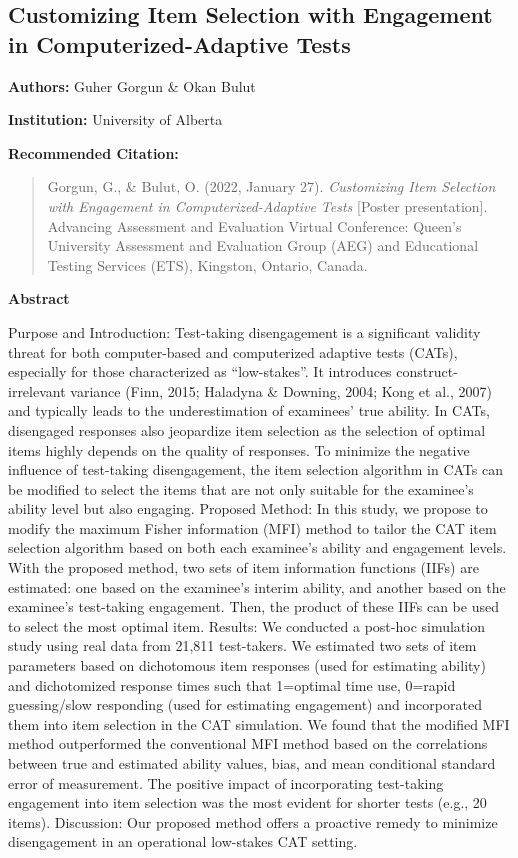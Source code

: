 \documentclass[
]{book}
\begin{document}
\newpage

\hypertarget{customizing-item-selection-with-engagement-in-computerized-adaptive-tests}{%
\subsection{Customizing Item Selection with Engagement in Computerized-Adaptive Tests}\label{customizing-item-selection-with-engagement-in-computerized-adaptive-tests}}

\textbf{Authors:} Guher Gorgun \& Okan Bulut

\textbf{Institution:} University of Alberta

\textbf{Recommended Citation:}

\begin{quote}
Gorgun, G., \& Bulut, O. (2022, January 27). \emph{Customizing Item Selection with Engagement in Computerized-Adaptive Tests} {[}Poster presentation{]}. Advancing Assessment and Evaluation Virtual Conference: Queen's University Assessment and Evaluation Group (AEG) and Educational Testing Services (ETS), Kingston, Ontario, Canada.
\end{quote}

\textbf{Abstract}

Purpose and Introduction: Test-taking disengagement is a significant validity threat for both computer-based and computerized adaptive tests (CATs), especially for those characterized as ``low-stakes''. It introduces construct-irrelevant variance (Finn, 2015; Haladyna \& Downing, 2004; Kong et al., 2007) and typically leads to the underestimation of examinees' true ability. In CATs, disengaged responses also jeopardize item selection as the selection of optimal items highly depends on the quality of responses. To minimize the negative influence of test-taking disengagement, the item selection algorithm in CATs can be modified to select the items that are not only suitable for the examinee's ability level but also engaging. Proposed Method: In this study, we propose to modify the maximum Fisher information (MFI) method to tailor the CAT item selection algorithm based on both each examinee's ability and engagement levels. With the proposed method, two sets of item information functions (IIFs) are estimated: one based on the examinee's interim ability, and another based on the examinee's test-taking engagement. Then, the product of these IIFs can be used to select the most optimal item. Results: We conducted a post-hoc simulation study using real data from 21,811 test-takers. We estimated two sets of item parameters based on dichotomous item responses (used for estimating ability) and dichotomized response times such that 1=optimal time use, 0=rapid guessing/slow responding (used for estimating engagement) and incorporated them into item selection in the CAT simulation. We found that the modified MFI method outperformed the conventional MFI method based on the correlations between true and estimated ability values, bias, and mean conditional standard error of measurement. The positive impact of incorporating test-taking engagement into item selection was the most evident for shorter tests (e.g., 20 items). Discussion: Our proposed method offers a proactive remedy to minimize disengagement in an operational low-stakes CAT setting.
\end{document}
